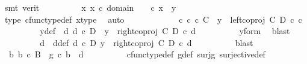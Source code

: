 \begin{isabellebody}
\ {\isacharparenleft}{\kern0pt}smt\ {\isacharparenleft}{\kern0pt}verit{\isacharparenright}{\kern0pt}{\isacharparenright}{\kern0pt}\isanewline
\ \ \ \ \ \ \isamarkupfalse%
\ \isamarkupfalse%
\ {\isachardoublequoteopen}{\isasymexists}x{\isachardot}{\kern0pt}\ x\ {\isasymin}\isactrlsub c\ domain\ {\isasymphi}\ {\isasymand}\ {\isasymphi}\ {\isasymcirc}\isactrlsub c\ x\ {\isacharequal}{\kern0pt}\ y{\isachardoublequoteclose}\isanewline
\ \ \ \ \ \ \ \ \isamarkupfalse%
\ {\isasymphi}{\isacharunderscore}{\kern0pt}type\ cfunc{\isacharunderscore}{\kern0pt}type{\isacharunderscore}{\kern0pt}def\ x{\isacharunderscore}{\kern0pt}type\ \isamarkupfalse%
\ auto\isanewline
\ \ \ \ \isamarkupfalse%
\isanewline
\ \ \ \ \ \ \isamarkupfalse%
\ {\isachardoublequoteopen}{\isasymnexists}c{\isachardot}{\kern0pt}\ c\ {\isasymin}\isactrlsub c\ C\ {\isasymand}\ y\ {\isacharequal}{\kern0pt}\ left{\isacharunderscore}{\kern0pt}coproj\ C\ D\ {\isasymcirc}\isactrlsub c\ c{\isachardoublequoteclose}\isanewline
\ \ \ \ \ \ \isamarkupfalse%
\ \isamarkupfalse%
\ y{\isacharunderscore}{\kern0pt}def{}{\isacharcolon}{\kern0pt}\ {\isachardoublequoteopen}{\isasymexists}\ d{\isachardot}{\kern0pt}\ d\ {\isasymin}\isactrlsub c\ D\ {\isasymand}\ y\ {\isacharequal}{\kern0pt}\ right{\isacharunderscore}{\kern0pt}coproj\ C\ D\ {\isasymcirc}\isactrlsub c\ d{\isachardoublequoteclose}\isanewline
\ \ \ \ \ \ \ \ \isamarkupfalse%
\ y{\isacharunderscore}{\kern0pt}form\ \isamarkupfalse%
\ blast\isanewline
\ \ \ \ \ \ \isamarkupfalse%
\ \isamarkupfalse%
\ d\ \ d{\isacharunderscore}{\kern0pt}def{\isacharcolon}{\kern0pt}\ {\isachardoublequoteopen}d\ {\isasymin}\isactrlsub c\ D{\isachardoublequoteclose}\ {\isachardoublequoteopen}y\ {\isacharequal}{\kern0pt}\ right{\isacharunderscore}{\kern0pt}coproj\ C\ D\ {\isasymcirc}\isactrlsub c\ d{\isachardoublequoteclose}\isanewline
\ \ \ \ \ \ \ \ \isamarkupfalse%
\ blast\isanewline
\ \ \ \ \ \ \isamarkupfalse%
\ \isamarkupfalse%
\ {\isachardoublequoteopen}{\isasymexists}\ b{\isachardot}{\kern0pt}\ b\ {\isasymin}\isactrlsub c\ B\ {\isasymand}\ g\ {\isasymcirc}\isactrlsub c\ b\ {\isacharequal}{\kern0pt}\ d{\isachardoublequoteclose}\isanewline
\ \ \ \ \ \ \ \ \isamarkupfalse%
\ cfunc{\isacharunderscore}{\kern0pt}type{\isacharunderscore}{\kern0pt}def\ g{\isacharunderscore}{\kern0pt}def\ surj{\isacharunderscore}{\kern0pt}g\ surjective{\isacharunderscore}{\kern0pt}def\ \isamarkupfalse%

\end{isabellebody}
